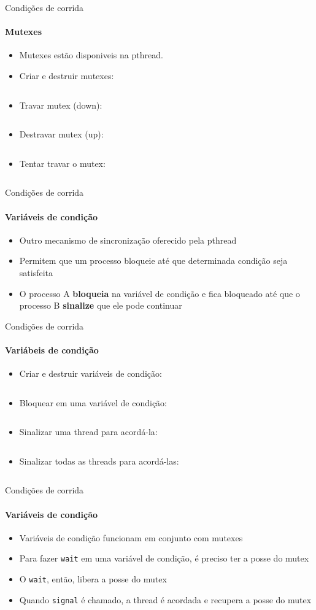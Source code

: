 \documentclass{beamer}
\begin{document}
\begin{frame}{Condições de corrida}
	\framesubtitle{Mutexes}
	\begin{itemize}
		\item Mutexes estão disponiveis na pthread.
		\item Criar e destruir mutexes:
		\inputminted{c}{resources/pthreadmutexcreate.c}
		\item Travar mutex (down):
		\inputminted{c}{resources/pthreadmutexdown.c}
		\item Destravar mutex (up):
		\inputminted{c}{resources/pthreadmutexup.c}
		\item Tentar travar o mutex:
		\inputminted{c}{resources/pthreadmutextry.c}
	\end{itemize}
\end{frame}
\begin{frame}{Condições de corrida}
	\framesubtitle{Variáveis de condição}
	\begin{itemize}
		\item Outro mecanismo de sincronização oferecido pela pthread
		\item Permitem que um processo bloqueie até que determinada condição seja satisfeita
		\item O processo A \textbf{bloqueia} na variável de condição e fica bloqueado até que o processo B \textbf{sinalize} que ele pode continuar
	\end{itemize}
\end{frame}
\begin{frame}{Condições de corrida}
	\framesubtitle{Variábeis de condição}
	\begin{itemize}
		\item Criar e destruir variáveis de condição:
		\inputminted{c}{resources/pthreadcondcreate.c}
		\item Bloquear em uma variável de condição:
		\inputminted{c}{resources/pthreadcondwait.c}
		\item Sinalizar uma thread para acordá-la:
		\inputminted{c}{resources/pthreadcondsignal.c}
		\item Sinalizar todas as threads para acordá-las:
		\inputminted{c}{resources/pthreadcondbroadcast.c}
	\end{itemize}
\end{frame}
\begin{frame}{Condições de corrida}
	\framesubtitle{Variáveis de condição}
	\begin{itemize}
		\item Variáveis de condição funcionam em conjunto com mutexes
		\item Para fazer \texttt{wait} em uma variável de condição, é preciso ter a posse do mutex
		\item O \texttt{wait}, então, libera a posse do mutex
		\item Quando \texttt{signal} é chamado, a thread é acordada e recupera a posse do mutex
	\end{itemize}
\end{frame}
\end{document}
